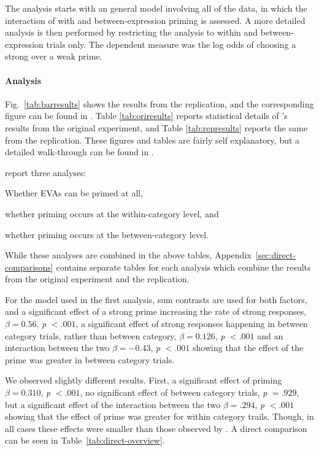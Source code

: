 \documentclass[10pt]{article}
\begin{document}
\begin{multicols}{2}
The analysis starts with an general model involving all of the data, in which the interaction of with and between-expression priming is assessed.
A more detailed analysis is then performed by restricting the analysis to within and between-expression trials only.
The dependent measure was the log odds of choosing a strong over a weak prime.

\paragraph{Analysis}

Fig.\ \ref{tab:barresults} shows the results from the replication, and the corresponding figure can be found in \textcite[122]{Bott:2016aa}.
Table \ref{tab:oriresults} reports statistical details of \citeauthor{Bott:2016aa}'s results from the original experiment, and Table \ref{tab:represults} reports the same from the replication.
These figures and tables are fairly self explanatory, but a detailed walk-through can be found in \textcite[125]{Bott:2016aa}.

\citeauthor{Bott:2016aa} report three analyses:
\begin{enumerate*}
\item Whether EVAs can be primed at all,
\item whether priming occurs at the within-category level, and
\item whether priming occurs at the between-category level.
\end{enumerate*}
While these analyses are combined in the above tables, Appendix~\ref{sec:direct-comparisons} contains separate tables for each analysis which combine the results from the original experiment and the replication.

For the model used in the first analysis, sum contrasts are used for both factors, and a significant effect of a strong prime increasing the rate of strong responses, \(\beta = 0.56\), \emph{p} \(< .001\), a significant effect of strong responses happening in between category trials, rather than between category, \(\beta = 0.126\), \emph{p} \(< .001\) and an interaction between the two \(\beta = -0.43\), \emph{p} \(< .001\) showing that the effect of the prime was greater in between category trials.

We observed slightly different results.
First, a significant effect of priming \(\beta = 0.310\), \emph{p} \(<.001\), no significant effect of between category trials, \emph{p} \(= .929\), but a significant effect of the interaction between the two \(\beta = .294\), \emph{p} \(<.001\) showing that the effect of prime was greater for within category trails.
Though, in all cases these effects were smaller than those observed by \citeauthor{Bott:2016aa}.
A direct comparison can be seen in Table~\ref{tab:direct-overview}.


\end{multicols}
\end{document}
